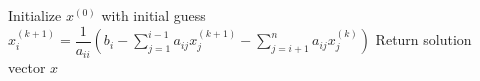 \begin{algorithm}[H]
\caption{Gauss-Seidel Iterative Method}
\begin{algorithmic}[1]
\STATE Initialize $x^{(0)}$ with initial guess
\REPEAT
        \STATE $x_i^{(k+1)} = \dfrac{1}{a_{ii}}\left(b_i - \sum_{j=1}^{i-1} a_{ij}x_j^{(k+1)} - \sum_{j=i+1}^n a_{ij}x_j^{(k)}\right)$
    \ENDFOR
{}
\STATE Return solution vector $x$
\end{algorithmic}
\end{algorithm}